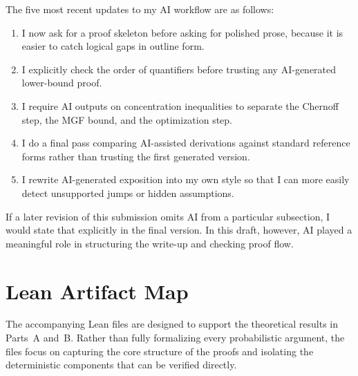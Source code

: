 \documentclass[11pt]{article}
\begin{document}
\begin{solutionbox}
The five most recent updates to my AI workflow are as follows:
\begin{enumerate}[leftmargin=2em]
    \item I now ask for a proof skeleton before asking for polished prose, because it is easier to catch logical gaps in outline form.
    \item I explicitly check the order of quantifiers before trusting any AI-generated lower-bound proof.
    \item I require AI outputs on concentration inequalities to separate the Chernoff step, the MGF bound, and the optimization step.
    \item I do a final pass comparing AI-assisted derivations against standard reference forms rather than trusting the first generated version.
    \item I rewrite AI-generated exposition into my own style so that I can more easily detect unsupported jumps or hidden assumptions.
\end{enumerate}

If a later revision of this submission omits AI from a particular subsection, I would state that explicitly in the final version. In this draft, however, AI played a meaningful role in structuring the write-up and checking proof flow.
\end{solutionbox}

\appendix

\section{Lean Artifact Map}
\label{app:lean}

The accompanying Lean files are designed to support the theoretical results in Parts~A and~B. 
Rather than fully formalizing every probabilistic argument, the files focus on capturing the 
core structure of the proofs and isolating the deterministic components that can be verified 
directly.

\medskip
\end{document}
